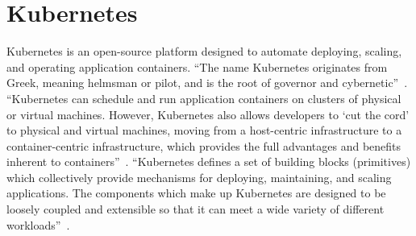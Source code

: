 \section{Kubernetes}

Kubernetes is an open-source platform designed to automate deploying, scaling, and operating application containers. ``The name Kubernetes originates from Greek, meaning helmsman or pilot, and is the root of governor and cybernetic''~\cite{hid-sp18-510-web-Kubernetes}. ``Kubernetes can schedule and run application containers on clusters of physical or virtual machines. However, Kubernetes also allows developers to ‘cut the cord’ to physical and virtual machines, moving from a host-centric infrastructure to a container-centric infrastructure, which provides the full advantages and benefits inherent to containers''~\cite{hid-sp18-510-med-Kubernetes}. ``Kubernetes defines a set of building blocks (primitives) which collectively provide mechanisms for deploying, maintaining, and scaling applications. The components which make up Kubernetes are designed to be loosely coupled and extensible so that it can meet a wide variety of different workloads''~\cite{hid-sp18-510-wiki-Kubernetes}.
